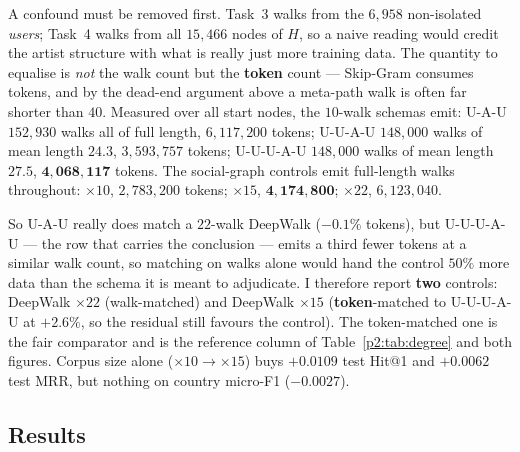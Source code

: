 A confound must be removed first.  Task~3 walks from the $6{,}958$ non-isolated \emph{users};
Task~4 walks from all $15{,}466$ nodes of $H$, so a naive reading would credit the artist
structure with what is really just more training data.  The quantity to equalise is
\emph{not} the walk count but the \textbf{token} count --- Skip-Gram consumes tokens, and by
the dead-end argument above a meta-path walk is often far shorter than $40$.
Measured over all start nodes, the $10$-walk schemas emit: \textsf{U-A-U} $152{,}930$ walks
all of full length, $6{,}117{,}200$ tokens; \textsf{U-U-A-U} $148{,}000$ walks of mean length
$24.3$, $3{,}593{,}757$ tokens; \textsf{U-U-U-A-U} $148{,}000$ walks of mean length $27.5$,
$\mathbf{4{,}068{,}117}$ tokens.  The social-graph controls emit full-length walks
throughout: $\times10$, $2{,}783{,}200$ tokens; $\times15$, $\mathbf{4{,}174{,}800}$;
$\times22$, $6{,}123{,}040$.

So \textsf{U-A-U} really does match a $22$-walk DeepWalk ($-0.1\%$ tokens), but
\textsf{U-U-U-A-U} --- the row that carries the conclusion --- emits a third fewer tokens at
a similar walk count, so matching on walks alone would hand the control $50\%$ more data than
the schema it is meant to adjudicate.  I therefore report \textbf{two} controls: DeepWalk
$\times22$ (walk-matched) and DeepWalk $\times15$ (\textbf{token}-matched to
\textsf{U-U-U-A-U} at $+2.6\%$, so the residual still favours the control).  The
token-matched one is the fair comparator and is the reference column of
Table~\ref{p2:tab:degree} and both figures.  Corpus size alone ($\times10\to\times15$) buys
$+0.0109$ test Hit@1 and $+0.0062$ test MRR, but nothing on country micro-F1 ($-0.0027$).

\subsection{Results}
\label{p2:sec:results}

